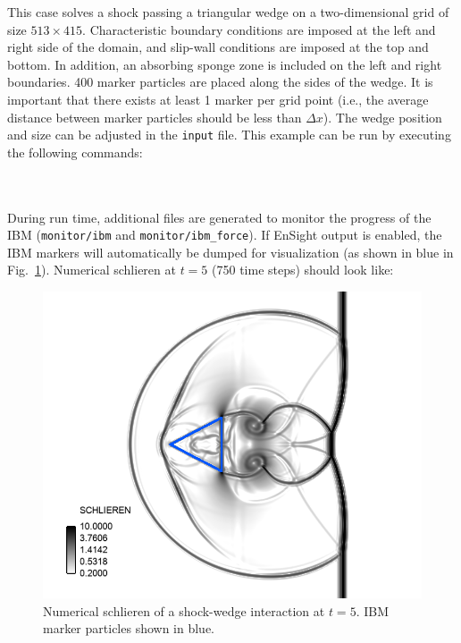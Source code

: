 \documentclass[12pt]{article}
\newcommand{\code}[1]{\texttt{#1}}
\begin{document}
This case solves a shock passing a triangular wedge on a two-dimensional grid of size $513\times 415$. Characteristic boundary conditions are imposed at the left and right side of the domain, and slip-wall conditions are imposed at the top and bottom. In addition, an absorbing sponge zone is included on the left and right boundaries. 400 marker particles are placed along the sides of the wedge. It is important that there exists at least 1 marker per grid point (i.e., the average distance between marker particles should be less than $\Delta x$). The wedge position and size can be adjusted in the \code{input} file. This example can be run by executing the following commands:
\\\\
\vspace{1em}
\vspace{.5em}
\\
During run time, additional files are generated to monitor the progress of the IBM (\code{monitor/ibm} and \code{monitor/ibm\_force}). If EnSight output is enabled, the IBM markers will automatically be dumped for visualization (as shown in blue in Fig.~\ref{fig:wedge}). Numerical schlieren at $t=5$ (750 time steps) should look like:
 \begin{figure}[h]
	\begin{center}
		\includegraphics[scale=0.35]{fig/ibm_wedge}
		\caption{Numerical schlieren of a shock-wedge interaction at $t=5$. IBM marker particles shown in blue.}
		\label{fig:wedge}
	\end{center}
\end{figure}
\end{document}
